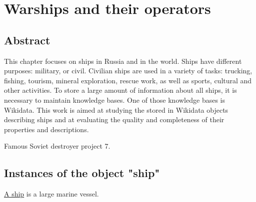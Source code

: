 \setchapterpreamble[u]{\margintoc}
\chapter{Warships and their operators\protect\footnotemark}


\section{Abstract}

This chapter focuses on ships in Russia and in the world. Ships have different purposes: military, or civil. Civilian ships are used in a variety of tasks: trucking, fishing, tourism, mineral exploration, rescue work, as well as sports, cultural and other activities. To store a large amount of information about all ships, it is necessary to maintain knowledge bases. One of those knowledge bases is Wikidata. This work is aimed at studying the stored in Wikidata objects describing ships and at evaluating the quality and completeness of their properties and descriptions.

\label{question:ship_1}

\begin{marginfigure}[0.0cm]
  {
    \setlength{\fboxsep}{0pt}%
    \setlength{\fboxrule}{1pt}%
  }
  \caption{Famous Soviet destroyer project 7.}%
  \label{fig:quiz_question_ship}%
\end{marginfigure}

\section{Instances of the object "ship"}

\href{https://en.wikipedia.org/wiki/Ship}{A ship} is a large marine vessel.

